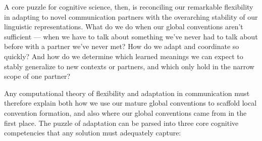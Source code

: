 \documentclass[11pt, floatsintext, man]{apa6}
\begin{document}
A core puzzle for cognitive science, then, is reconciling our remarkable flexibility in adapting to novel communication partners with the overarching stability of our linguistic representations. What do we do when our global conventions aren't sufficient --- when we have to talk about something we've never had to talk about before with a partner we've never met? How do we adapt and coordinate so quickly? And how do we determine which learned meanings we can expect to stably generalize to new contexts or partners, and which only hold in the narrow scope of one partner?

Any computational theory of flexibility and adaptation in communication must therefore explain both how we use our mature global conventions to scaffold local convention formation, and also where our global conventions came from in the first place. The puzzle of adaptation can be parsed into three core cognitive competencies that any solution must adequately capture: 
\end{document}
